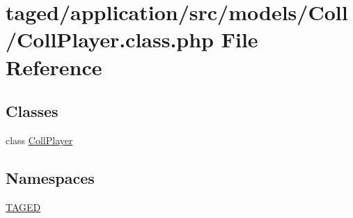 \hypertarget{_coll_player_8class_8php}{}\section{taged/application/src/models/\+Coll/\+Coll\+Player.class.\+php File Reference}
\label{_coll_player_8class_8php}
\subsection*{Classes}
\begin{DoxyCompactItemize}
\item 
class \hyperlink{class_coll_player}{Coll\+Player}
\end{DoxyCompactItemize}
\subsection*{Namespaces}
\begin{DoxyCompactItemize}
\item 
 \hyperlink{namespace_t_a_g_e_d}{T\+A\+G\+ED}
\end{DoxyCompactItemize}
